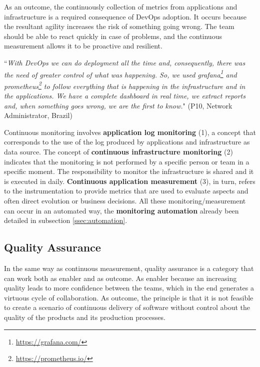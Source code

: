 As an outcome, the continuously collection of metrics from applications and
infrastructure is a required consequence of DevOps adoption. It occurs because
the resultant agility increases the risk of something going wrong. The team
should be able to react quickly in case of problems, and the continuous
measurement allows it to be proactive and resilient.

\begin{mq}
``\emph{With DevOps we can do deployment all the time and, consequently, there was
the need of greater control of what was happening. So, we used
grafana\footnote{\url{https://grafana.com/}} and
prometheus\footnote{\url{https://prometheus.io/}} to follow everything that is
happening in the infrastructure and in the applications. We have a complete
dashboard in real time, we extract reports and, when something goes wrong, we
are the first to know.}" (P10, Network Administrator, Brazil)
\end{mq}

Continuous monitoring involves \textbf{application log monitoring} (1), a
concept that corresponds to the use of the log produced by
applications and infrastructure as data source. The concept of
\textbf{continuous infrastructure monitoring} (2) indicates that the monitoring
is not performed by a specific person or team in a specific moment. The
responsibility to monitor the infrastructure is shared and it is executed in
daily. \textbf{Continuous application measurement} (3), in turn, refers to
the instrumentation to provide metrics that are used to evaluate aspects and
often direct evolution or business decisions. All these monitoring/measurement
can occur in an automated way, the \textbf{monitoring automation} already been
detailed in subsection \ref{ssec:automation}.

\subsection{Quality Assurance}

In the same way as continuous measurement, quality assurance is a category that
can work both as enabler and as outcome. As enabler because an increasing quality
leads to more confidence between the teams, which in the end generates a virtuous
cycle of collaboration. As outcome, the principle is that it is not
feasible to create a scenario of continuous delivery of software without control
about the quality of the products and its production processes.

